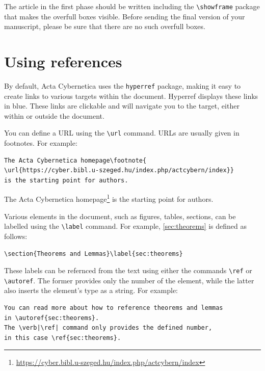 \documentclass[withtitlethanks]{actacyb}
\begin{document}
The article in the first phase should be written including the \verb|\showframe| package that makes the overfull boxes visible. Before sending the final version of your manuscript, please be sure that there are no such overfull boxes.


\section{Using references}

By default, Acta Cybernetica uses the \verb|hyperref| package, making it easy to create links to various targets within the document. Hyperref displays these links in blue. These links are clickable and will navigate you to the target, either within or outside the document.

You can define a URL using the \verb|\url| command. URLs are usually given in footnotes. For example:

\begin{verbatim}
The Acta Cybernetica homepage\footnote{
\url{https://cyber.bibl.u-szeged.hu/index.php/actcybern/index}}
is the starting point for authors.
\end{verbatim}

The Acta Cybernetica homepage\footnote{
\url{https://cyber.bibl.u-szeged.hu/index.php/actcybern/index}}
is the starting point for authors.

\medskip
Various elements in the document, such as figures, tables, sections, can be labelled using the \verb|\label| command. For example, \autoref{sec:theorems} is defined as follows:

\begin{verbatim}
\section{Theorems and Lemmas}\label{sec:theorems}
\end{verbatim}

These labels can be refernced from the text using either the commands \verb|\ref| or \verb|\autoref|. The former provides only the number of the element, while the latter also inserts the element's type as a string. For example:

\begin{verbatim}
You can read more about how to reference theorems and lemmas
in \autoref{sec:theorems}.
The \verb|\ref| command only provides the defined number,
in this case \ref{sec:theorems}.
\end{verbatim}
\end{document}
